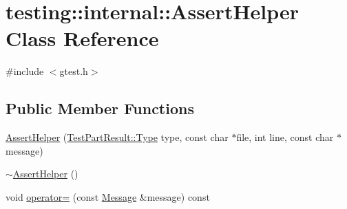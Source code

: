 \hypertarget{classtesting_1_1internal_1_1_assert_helper}{\section{testing\+:\+:internal\+:\+:Assert\+Helper Class Reference}
\label{classtesting_1_1internal_1_1_assert_helper}
}


{\ttfamily \#include $<$gtest.\+h$>$}

\subsection*{Public Member Functions}
\begin{DoxyCompactItemize}
\item 
\hyperlink{classtesting_1_1internal_1_1_assert_helper_ac2c9334518fd4087189b4505567a3c90}{Assert\+Helper} (\hyperlink{classtesting_1_1_test_part_result_a65ae656b33fdfdfffaf34858778a52d5}{Test\+Part\+Result\+::\+Type} type, const char $\ast$file, int line, const char $\ast$message)
\item 
\hyperlink{classtesting_1_1internal_1_1_assert_helper_a51c640785d4ed4a0155cc9aa857d8931}{$\sim$\+Assert\+Helper} ()
\item 
void \hyperlink{classtesting_1_1internal_1_1_assert_helper_ab721be11cb9aca8a361ca1f014ca5f80}{operator=} (const \hyperlink{classtesting_1_1_message}{Message} \&message) const 
\end{DoxyCompactItemize}


